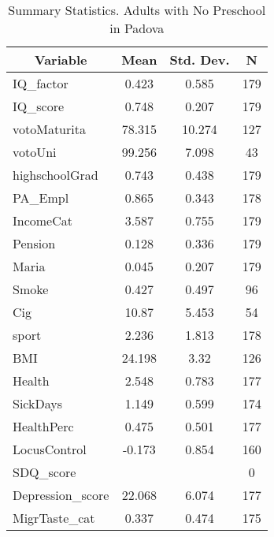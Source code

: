 
\begin{table}[htbp]\centering \caption{Summary Statistics. Adults with No Preschool in Padova \label{bothAdultmaternaNonePadova}}
\begin{tabular}{l c c  c}\hline\hline
\multicolumn{1}{c}{\textbf{Variable}} & \textbf{Mean}
 & \textbf{Std. Dev.} & \textbf{N}\\ \hline
IQ\_factor & 0.423 & 0.585  & 179\\
IQ\_score & 0.748 & 0.207  & 179\\
votoMaturita & 78.315 & 10.274  & 127\\
votoUni & 99.256 & 7.098  & 43\\
highschoolGrad & 0.743 & 0.438  & 179\\
PA\_Empl & 0.865 & 0.343  & 178\\
IncomeCat & 3.587 & 0.755  & 179\\
Pension & 0.128 & 0.336  & 179\\
Maria & 0.045 & 0.207  & 179\\
Smoke & 0.427 & 0.497  & 96\\
Cig & 10.87 & 5.453  & 54\\
sport & 2.236 & 1.813  & 178\\
BMI & 24.198 & 3.32  & 126\\
Health & 2.548 & 0.783  & 177\\
SickDays & 1.149 & 0.599  & 174\\
HealthPerc & 0.475 & 0.501  & 177\\
LocusControl & -0.173 & 0.854  & 160\\
SDQ\_score &  &   & 0\\
Depression\_score & 22.068 & 6.074  & 177\\
MigrTaste\_cat & 0.337 & 0.474  & 175\\
\hline\end{tabular}
\end{table}
